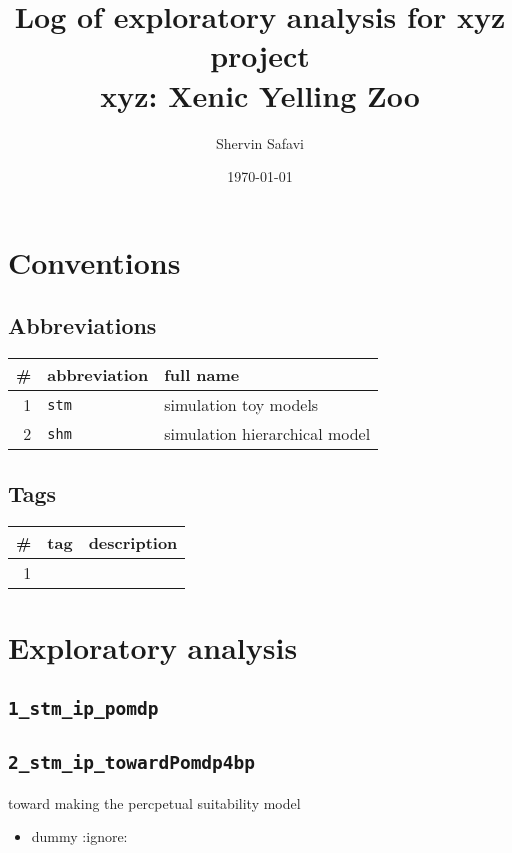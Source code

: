 \documentclass[a4paper, 11pt, colorlinks=true, citecolor=., linkcolor=black, urlcolor=black]{article}
\author{Shervin Safavi}
\date{\today}
\title{Log of exploratory analysis for \textbf{xyz} project\\\medskip
\large \textbf{xyz:} Xenic Yelling Zoo}
\begin{document}
\tableofcontents

\maketitle

\section{Conventions}
\label{sec:org342d9a7}
\subsection{Abbreviations}
\label{sec:org2fcc74e}


\begin{center}
\begin{tabular}{rll}
\# & abbreviation & full name\\
\hline
1 & \texttt{stm} & simulation toy models\\
2 & \texttt{shm} & simulation hierarchical model\\
\end{tabular}
\end{center}

\subsection{Tags}
\label{sec:org4d28035}

\begin{center}
\begin{tabular}{rll}
\# & tag & description\\
\hline
1 &  & \\
\end{tabular}
\end{center}

\clearpage

\section{Exploratory analysis}
\label{sec:org40db017}
\subsection{\texttt{1\_stm\_ip\_pomdp}}
\label{sec:orgbc5739f}
\subsection{\texttt{2\_stm\_ip\_towardPomdp4bp}}
\label{sec:org9509dd3}
toward making the percpetual suitability model

\begin{itemize}
\item dummy :ignore:
\end{itemize}
\end{document}
